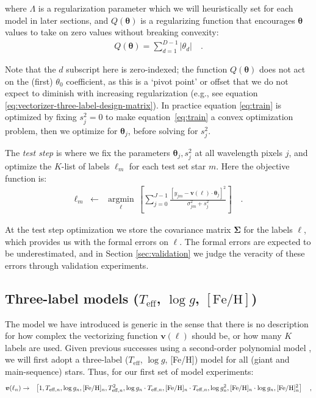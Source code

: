 \documentclass[preprint,trackchanges]{aastex}
\newcommand{\teff}{T_{\mathrm{eff}}}
\newcommand{\logg}{\log g}
\newcommand{\feh}{[\mathrm{Fe/H}]}
\newcommand{\Dvector}[1]{\boldsymbol{#1}}
\newcommand{\vectheta}{\Dvector{\theta}}
\newcommand{\vecv}{\Dvector{v}}
\newcommand{\argmin}[1]{\underset{#1}{\operatorname{argmin}}\,}
\begin{document}
\noindent{}where $\Lambda$ is a regularization parameter which we will heuristically set
for each model in later sections, and $Q(\vectheta)$ is a regularizing function that 
encourages $\vectheta$ values to take on zero values without breaking convexity:
\begin{eqnarray}\label{eq:regularization-function}
	Q(\vectheta) = \sum_{d=1}^{D-1} |{\theta_d}| \quad .
\end{eqnarray}

Note that the $d$ subscript here is zero-indexed; the function $Q(\vectheta)$ does not act
on the (first) $\theta_0$ coefficient, as this is a `pivot point' or offset that we do not
expect to diminish with increasing regularization (e.g., see equation 
\ref{eq:vectorizer-three-label-design-matrix}).  In practice equation \ref{eq:train} is 
optimized by fixing $s_j^2 = 0$ to make equation~\ref{eq:train} a convex optimization 
problem, then we optimize for $\vectheta_j$, before solving for $s_j^2$.  


The \emph{test step} is where we fix the parameters $\vectheta_j,s_j^2$ at all wavelength
pixels $j$, and optimize the $K$-list of labels $\ell_m$ for each test set star $m$.  Here
the objective function is:
\begin{eqnarray}\label{eq:test}
  \ell_m &\leftarrow& \argmin{\ell}\left[
    \sum_{j=0}^{J-1} \frac{[y_{jm}-\vecv(\ell)\cdot\vectheta_j]^2}{\sigma_{jm}^2 + s_j^2}
    \right]
  \quad .
\end{eqnarray}

At the test step optimization we store the covariance matrix $\bm{\Sigma}$ for the labels
$\ell$, which provides us with the formal errors on $\ell$.  The formal errors are expected
to be underestimated, and in Section \ref{sec:validation} we judge the veracity of these 
errors through validation experiments.


\subsection{Three-label models ($\teff$, $\logg$, $\feh$)}
\label{sec:a-simple-model}

The model we have introduced is generic in the sense that there is no description for how
complex the vectorizing function $\vecv(\ell)$ should be, or how many $K$ labels are used.
Given previous successes using a second-order polynomial model 
\citep{Ness_2015,Ness_2016,Ho_2016,Casey_2016b}, we will first adopt a three-label ($\teff$, $\logg$, [Fe/H]) model for all (giant and main-sequence) stars. Thus, for our first set of
model experiments:
\begin{eqnarray}\label{eq:vectorizer-three-label}
\vecv(\ell_n) & \rightarrow & \left[1, T_{{\rm eff},n}, \logg_n, [{\rm Fe/H}]_n, T_{{\rm eff},n}^2, \logg_n\cdot{}T_{{\rm eff},n}, \feh_n\cdot{}T_{{\rm eff},n}, \logg_n^2, \feh_n\cdot\logg_n, \feh_n^2\right]
\quad ,
\end{eqnarray}
\end{document}
